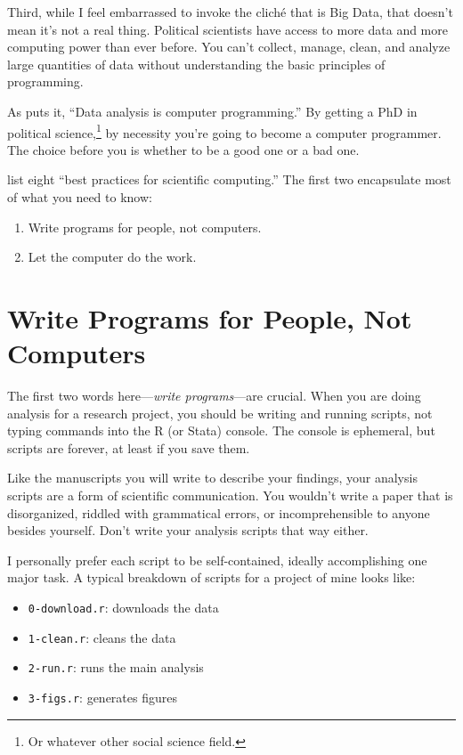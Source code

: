 \documentclass[
  12pt,
  oneside,openany]{book}
\providecommand{\tightlist}{%
  \setlength{\itemsep}{0pt}\setlength{\parskip}{0pt}}
\begin{document}
Third, while I feel embarrassed to invoke the cliché that is Big Data, that doesn't mean it's not a real thing. Political scientists have access to more data and more computing power than ever before. You can't collect, manage, clean, and analyze large quantities of data without understanding the basic principles of programming.

As \citet{Bowers:2011ua} puts it, ``Data analysis is computer programming.'' By getting a PhD in political science,\footnote{Or whatever other social science field.} by necessity you're going to become a computer programmer. The choice before you is whether to be a good one or a bad one.

\citet{Wilson:2014ck} list eight ``best practices for scientific computing.'' The first two encapsulate most of what you need to know:

\begin{enumerate}
\def\labelenumi{\arabic{enumi}.}
\tightlist
\item
  Write programs for people, not computers.
\item
  Let the computer do the work.
\end{enumerate}

\hypertarget{write-programs-for-people-not-computers}{%
\section{Write Programs for People, Not Computers}\label{write-programs-for-people-not-computers}}

The first two words here---\emph{write programs}---are crucial. When you are doing analysis for a research project, you should be writing and running scripts, not typing commands into the R (or Stata) console. The console is ephemeral, but scripts are forever, at least if you save them.

Like the manuscripts you will write to describe your findings, your analysis scripts are a form of scientific communication. You wouldn't write a paper that is disorganized, riddled with grammatical errors, or incomprehensible to anyone besides yourself. Don't write your analysis scripts that way either.

I personally prefer each script to be self-contained, ideally accomplishing one major task. A typical breakdown of scripts for a project of mine looks like:

\begin{itemize}
\tightlist
\item
  \texttt{0-download.r}: downloads the data
\item
  \texttt{1-clean.r}: cleans the data
\item
  \texttt{2-run.r}: runs the main analysis
\item
  \texttt{3-figs.r}: generates figures
\end{itemize}
\end{document}
